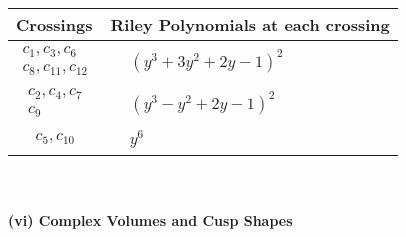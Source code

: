 \documentclass[1p]{elsarticle_modified}
\theoremstyle{definition}
\begin{document}
\begin{tabular}{m{50pt}|m{274pt}}
Crossings & \hspace{64pt}Riley Polynomials at each crossing \\
\hline $$\begin{aligned}c_{1},c_{3},c_{6}\\c_{8},c_{11},c_{12}\end{aligned}$$&$\begin{aligned}
&(y^3+3 y^2+2 y-1)^2
\end{aligned}$\\
\hline $$\begin{aligned}c_{2},c_{4},c_{7}\\c_{9}\end{aligned}$$&$\begin{aligned}
&(y^3- y^2+2 y-1)^2
\end{aligned}$\\
\hline $$\begin{aligned}c_{5},c_{10}\end{aligned}$$&$\begin{aligned}
&y^6
\end{aligned}$\\
\hline
\end{tabular}\\~\\
\newpage\flushleft \textbf{(vi) Complex Volumes and Cusp Shapes}
\end{document}
